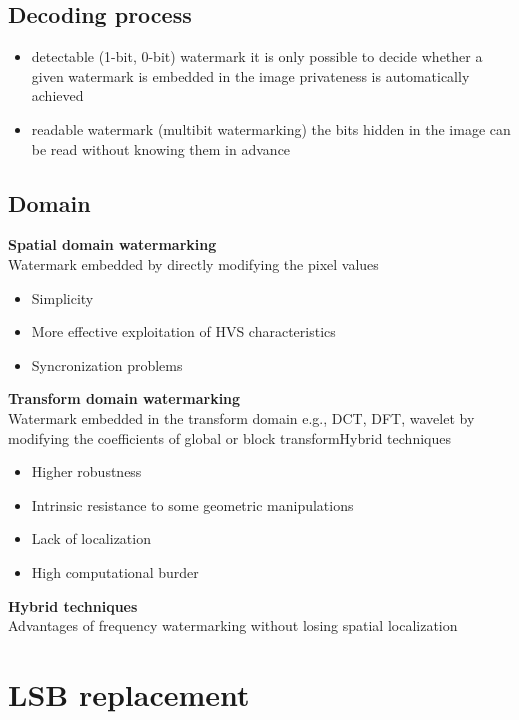 \documentclass[10pt,a4paper]{book}
\begin{document}
\subsection{Decoding process}

\begin{itemize}
\item detectable (1-bit, 0-bit) watermark	it is only possible to decide whether a given watermark is embedded in the image privateness is automatically achieved 
\item readable watermark (multibit watermarking) the bits hidden in the image can be read without knowing them in advance
\end{itemize}


\subsection{Domain}

\textbf{Spatial domain watermarking}\\
Watermark  embedded by directly modifying the pixel values 
\begin{itemize}
\item Simplicity 
\item More effective exploitation of HVS characteristics 
\item Syncronization problems
\end{itemize}

\textbf{Transform domain watermarking}\\
Watermark embedded in the transform domain e.g., DCT, DFT, wavelet by modifying the coefficients of global or block transformHybrid techniques 
\begin{itemize}
\item Higher robustness 
\item Intrinsic resistance to some geometric manipulations 
\item Lack of localization 
\item High computational burder
\end{itemize}

\textbf{Hybrid techniques}\\
Advantages of frequency watermarking without losing spatial localization
\newpage
\section{LSB replacement}
\end{document}

